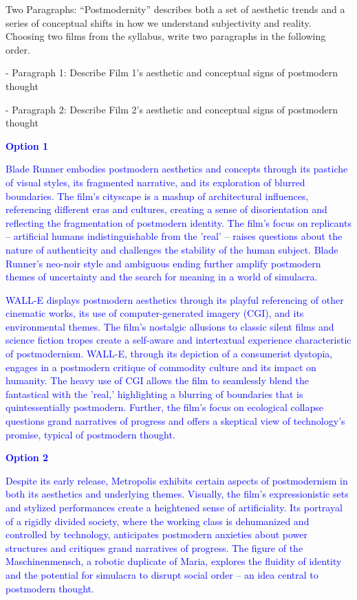 \documentclass[11pt,fleqn]{book}
\begin{document}
\begin{exercise}
    Two Paragraphs: “Postmodernity” describes both a set of aesthetic trends and a series of conceptual shifts in how we understand subjectivity and reality. Choosing two films from the syllabus, write two paragraphs in the following order.

- Paragraph 1: Describe Film 1’s aesthetic and conceptual signs of postmodern thought

- Paragraph 2: Describe Film 2’s aesthetic and conceptual signs of postmodern thought

    \textcolor{blue}{
\textbf{Option 1}
}

    \textcolor{blue}{
Blade Runner embodies postmodern aesthetics and concepts through its pastiche of visual styles, its fragmented narrative, and its exploration of blurred boundaries. The film's cityscape is a mashup of architectural influences, referencing different eras and cultures, creating a sense of disorientation and reflecting the fragmentation of postmodern identity. The film's focus on replicants – artificial humans indistinguishable from the 'real' –  raises questions about the nature of authenticity and challenges the stability of the human subject. Blade Runner's neo-noir style and ambiguous ending further amplify postmodern themes of uncertainty and the search for meaning in a world of simulacra.
}

    \textcolor{blue}{
WALL-E displays postmodern aesthetics through its playful referencing of other cinematic works, its use of computer-generated imagery (CGI), and its environmental themes. The film's nostalgic allusions to classic silent films and science fiction tropes create a self-aware and intertextual experience characteristic of postmodernism.  WALL-E, through its depiction of a consumerist dystopia, engages in a postmodern critique of commodity culture and its impact on humanity.  The heavy use of CGI allows the film to seamlessly blend the fantastical with the 'real,' highlighting a blurring of boundaries that is quintessentially postmodern. Further, the film's focus on ecological collapse questions grand narratives of progress and offers a skeptical view of technology's promise, typical of postmodern thought.
}

    \textcolor{blue}{
\textbf{Option 2}
}

    \textcolor{blue}{
Despite its early release, Metropolis exhibits certain aspects of postmodernism in both its aesthetics and underlying themes. Visually, the film's expressionistic sets and stylized performances create a heightened sense of artificiality. Its portrayal of a rigidly divided society, where the working class is dehumanized and controlled by technology, anticipates postmodern anxieties about power structures and critiques grand narratives of progress.  The figure of the Maschinenmensch, a robotic duplicate of Maria,  explores the fluidity of identity and the potential for simulacra to disrupt social order – an idea central to postmodern thought.
}


\end{exercise}
\end{document}

